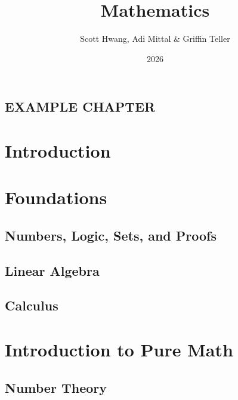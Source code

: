 \documentclass[oneside,openany]{book}
\title{Mathematics}
\author{Scott Hwang, Adi Mittal \& Griffin Teller}
\date{2026}
\theoremstyle{definition}
\begin{document}
\maketitle

\tableofcontents

\chapter{EXAMPLE CHAPTER}



\part{Introduction}



\part{Foundations}


\chapter{Numbers, Logic, Sets, and Proofs}


\chapter{Linear Algebra}


\chapter{Calculus}



\part{Introduction to Pure Math}

\chapter{Number Theory}

\end{document}
